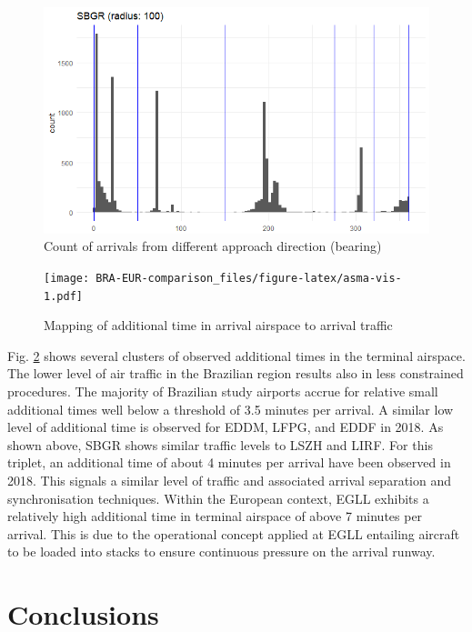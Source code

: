 \documentclass[
]{book}
\begin{document}
\begin{figure}
\includegraphics[width=9.71in]{./figures/SBGR-ASMA100-histogram} \caption{Count of arrivals from different approach direction (bearing)}\label{fig:asma-hist}
\end{figure}



\begin{figure}
\centering
\texttt{[image: BRA-EUR-comparison\_files/figure-latex/asma-vis-1.pdf]}
\caption{\label{fig:asma-vis}Mapping of additional time in arrival airspace to arrival traffic}
\end{figure}

Fig. \ref{fig:asma-vis} shows several clusters of observed additional times in the terminal airspace.
The lower level of air traffic in the Brazilian region results also in less constrained procedures.
The majority of Brazilian study airports accrue for relative small additional times well below a threshold of 3.5 minutes per arrival.
A similar low level of additional time is observed for EDDM, LFPG, and EDDF in 2018.
As shown above, SBGR shows similar traffic levels to LSZH and LIRF.
For this triplet, an additional time of about 4 minutes per arrival have been observed in 2018.
This signals a similar level of traffic and associated arrival separation and synchronisation techniques.
Within the European context, EGLL exhibits a relatively high additional time in terminal airspace of above 7 minutes per arrival.
This is due to the operational concept applied at EGLL entailing aircraft to be loaded into stacks to ensure continuous pressure on the arrival runway.

\hypertarget{conclusions}{%
\chapter{Conclusions}\label{conclusions}}
\end{document}
